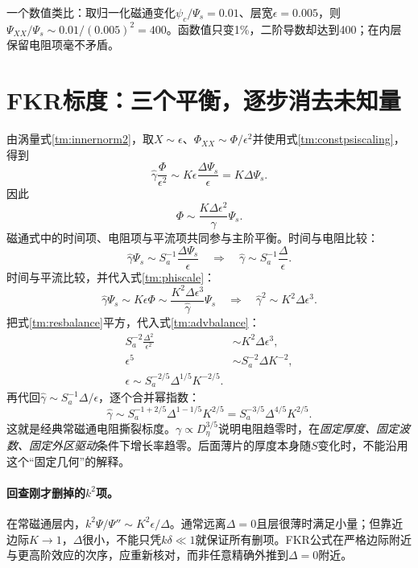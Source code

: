 一个数值类比：取归一化磁通变化$\psi_c/\Psi_s=0.01$、层宽$\epsilon=0.005$，则$\Psi_{XX}/\Psi_s\sim0.01/(0.005)^2=400$。函数值只变1\%，二阶导数却达到400；在内层保留电阻项毫不矛盾。

\section{FKR标度：三个平衡，逐步消去未知量}
由涡量式\eqref{tm:innernorm2}，取$X\sim\epsilon$、$\Phi_{XX}\sim\Phi/\epsilon^2$并使用式\eqref{tm:constpsiscaling}，得到
\begin{equation}
 \hat\gamma\frac{\Phi}{\epsilon^2}
 \sim K\epsilon\frac{\Delta\Psi_s}{\epsilon}
 =K\Delta\Psi_s.
\end{equation}
因此
\begin{equation}
 \Phi\sim\frac{K\Delta\epsilon^2}{\hat\gamma}\Psi_s.
 \label{tm:phiscale}
\end{equation}
磁通式中的时间项、电阻项与平流项共同参与主阶平衡。时间与电阻比较：
\begin{equation}
 \hat\gamma\Psi_s\sim S_a^{-1}\frac{\Delta\Psi_s}{\epsilon}
 \quad\Rightarrow\quad
 \hat\gamma\sim S_a^{-1}\frac{\Delta}{\epsilon}.
 \label{tm:resbalance}
\end{equation}
时间与平流比较，并代入式\eqref{tm:phiscale}：
\begin{equation}
 \hat\gamma\Psi_s\sim K\epsilon\Phi
 \sim\frac{K^2\Delta\epsilon^3}{\hat\gamma}\Psi_s
 \quad\Rightarrow\quad
 \hat\gamma^2\sim K^2\Delta\epsilon^3.
 \label{tm:advbalance}
\end{equation}
把式\eqref{tm:resbalance}平方，代入式\eqref{tm:advbalance}：
\begin{align}
 S_a^{-2}\frac{\Delta^2}{\epsilon^2}&\sim K^2\Delta\epsilon^3,\\
 \epsilon^5&\sim S_a^{-2}\Delta K^{-2},\\
 \boxed{\epsilon\sim S_a^{-2/5}\Delta^{1/5}K^{-2/5}.}\label{tm:FKRdelta}
\end{align}
再代回$\hat\gamma\sim S_a^{-1}\Delta/\epsilon$，逐个合并幂指数：
\begin{equation}
 \boxed{\hat\gamma\sim
 S_a^{-1+2/5}\Delta^{1-1/5}K^{2/5}
 =S_a^{-3/5}\Delta^{4/5}K^{2/5}.}
 \label{tm:FKRgamma}
\end{equation}
这就是经典常磁通电阻撕裂标度。$\gamma\propto D_\eta^{3/5}$说明电阻趋零时，在\emph{固定厚度、固定波数、固定外区驱动}条件下增长率趋零。后面薄片的厚度本身随$S$变化时，不能沿用这个“固定几何”的解释。

\paragraph{回查刚才删掉的$k^2$项。}
在常磁通层内，$k^2\Psi/\Psi''\sim K^2\epsilon/\Delta$。通常远离$\Delta=0$且层很薄时满足小量；但靠近边际$K\to1$，$\Delta$很小，不能只凭$k\delta\ll1$就保证所有删项。FKR公式在严格边际附近与更高阶效应的次序，应重新核对，而非任意精确外推到$\Delta=0$附近。

